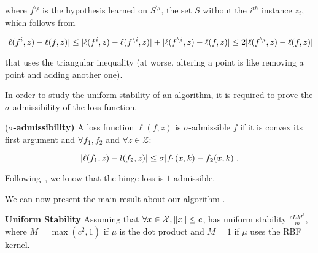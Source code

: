 where $f^{\setminus i}$ is the hypothesis learned on $S^{\setminus i}$, the set $S$ without the $i^{th}$ instance $z_i$, which follows from

$$| \ell(f^{i},z) - \ell(f,z) | \leq | \ell(f^{i},z) - \ell(f^{\setminus i},z) | + | \ell(f^{\setminus i},z) - \ell(f,z) |  \leq 2 | \ell(f^{\setminus i},z) - \ell(f,z) |$$

that uses the triangular inequality (at worse, altering a point is like removing a point and adding another one).

In order to study the uniform stability of an algorithm, it is required to prove the  $\sigma$-admissibility of the loss function.

\begin{defn}{(\bf{$\sigma$-admissibility})}
    A loss function $\ell(f,z)$ is $\sigma$-admissible \wrt $f$ if it is convex \wrt its first argument and $\forall f_1,f_2 $ and $\forall z \in \mathcal{Z}$:

    $$ | \ell(f_1,z) - l(f_2,z) | \leq \sigma | f_1(x,k)-f_2(x,k) | .$$
\end{defn}

Following~\cite{bousquet2002stability}, we know that the hinge loss is $1$-admissible.

We can now present the main result about our algorithm \landSVM.

\begin{thm}{\bf{\landSVM Uniform Stability}}
  Assuming that  $ \forall x \in \mathcal{X}, \left\| x \right\| \leq c$,  \landSVM has uniform stability  $ \frac{c L M^2}{m}$,
where $M = \max(c^2,1)$ if  $\mu$ is the dot product and $M = 1$ if $\mu$ uses the RBF kernel.
\end{thm}

